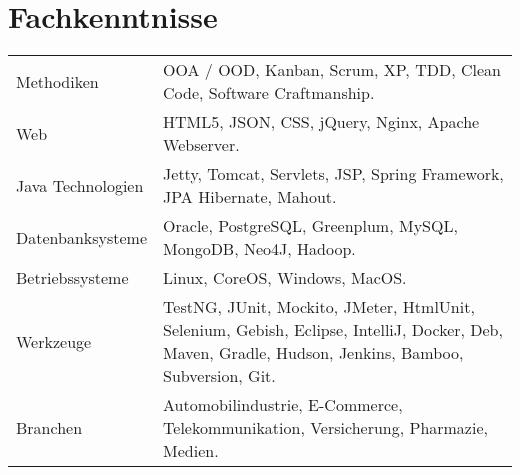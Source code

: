 \section*{Fachkenntnisse}
\begin{longtable}{@{}p{6cm}p{10cm}}
Methodiken	        & OOA / OOD, Kanban, Scrum, XP, TDD, Clean Code, Software Craftmanship.\\
Web         	    & HTML5, JSON, CSS, jQuery, Nginx, Apache Webserver.\\
Java Technologien	& Jetty, Tomcat, Servlets, JSP, Spring Framework, JPA Hibernate, Mahout.\\
Datenbanksysteme	& Oracle, PostgreSQL, Greenplum, MySQL, MongoDB, Neo4J, Hadoop.\\
Betriebssysteme	    & Linux, CoreOS, Windows, MacOS.\\
Werkzeuge		    & TestNG, JUnit, Mockito, JMeter, HtmlUnit, Selenium, Gebish, Eclipse, IntelliJ, Docker, Deb, Maven, Gradle, Hudson, Jenkins, Bamboo, Subversion, Git.\\
Branchen		    & Automobilindustrie, E-Commerce, Telekommunikation, Versicherung, Pharmazie, Medien.\\
\end{longtable}
